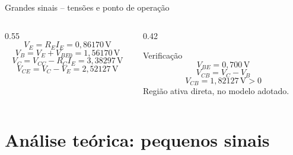 \documentclass[aspectratio=169,11pt]{beamer}
\begin{document}
\begin{frame}{Grandes sinais -- tensões e ponto de operação}
  \begin{columns}[T,onlytextwidth]
    \begin{column}{0.55\textwidth}
      \small
      \[
      V_E=R_E I_E=\boxed{0{,}86170\,\mathrm V}
      \]
      \[
      V_B=V_E+V_{BE0}=\boxed{1{,}56170\,\mathrm V}
      \]
      \[
      V_C=V_{CC}-R_C I_E=\boxed{3{,}38297\,\mathrm V}
      \]
      \[
      V_{CE}=V_C-V_E=\boxed{2{,}52127\,\mathrm V}
      \]
    \end{column}
    \begin{column}{0.42\textwidth}
      \begin{block}{Verificação}
        \[
        V_{BE}=0{,}700\,\mathrm V
        \]
        \[
        V_{CB}=V_C-V_B
        \]
        \[
        V_{CB}=1{,}82127\,\mathrm V>0
        \]
        \centering\small Região ativa direta, no modelo adotado.
      \end{block}
    \end{column}
  \end{columns}
  \vspace{0.18cm}
\end{frame}


\section{Análise teórica: pequenos sinais}

\end{document}
